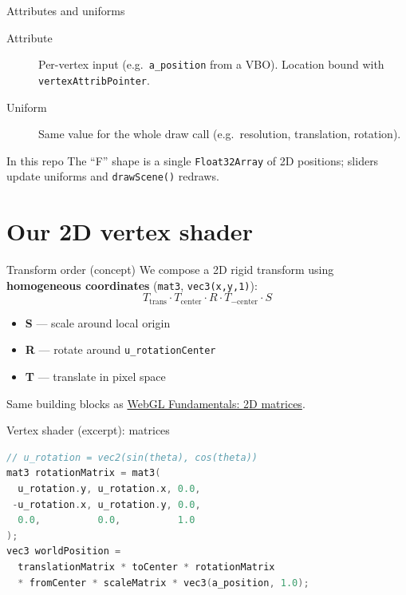\documentclass[aspectratio=169]{beamer}
\begin{document}
\begin{frame}{Attributes and uniforms}
  \begin{description}
    \item[Attribute] Per-vertex input (e.g.\ \texttt{a\_position} from a VBO). Location bound with \texttt{vertexAttribPointer}.
    \item[Uniform] Same value for the whole draw call (e.g.\ resolution, translation, rotation).
  \end{description}
  \vfill
  \begin{block}{In this repo}
    The ``F'' shape is a single \texttt{Float32Array} of 2D positions; sliders update uniforms and \texttt{drawScene()} redraws.
  \end{block}
\end{frame}

\section{Our 2D vertex shader}

\begin{frame}{Transform order (concept)}
  We compose a 2D rigid transform using \textbf{homogeneous coordinates} (\texttt{mat3}, \texttt{vec3(x,y,1)}):
  \[
    T_{\text{trans}} \cdot T_{\text{center}} \cdot R \cdot T_{-\text{center}} \cdot S
  \]
  \begin{itemize}
    \item \textbf{S} — scale around local origin
    \item \textbf{R} — rotate around \texttt{u\_rotationCenter}
    \item \textbf{T} — translate in pixel space
  \end{itemize}
  \vfill
  \small
  Same building blocks as \href{https://webglfundamentals.org/webgl/lessons/webgl-2d-matrices.html}{WebGL Fundamentals: 2D matrices}.
\end{frame}

\begin{frame}[fragile]{Vertex shader (excerpt): matrices}
\begin{lstlisting}[language=C]
// u_rotation = vec2(sin(theta), cos(theta))
mat3 rotationMatrix = mat3(
  u_rotation.y, u_rotation.x, 0.0,
 -u_rotation.x, u_rotation.y, 0.0,
  0.0,          0.0,          1.0
);
vec3 worldPosition =
  translationMatrix * toCenter * rotationMatrix
  * fromCenter * scaleMatrix * vec3(a_position, 1.0);
\end{lstlisting}
\end{frame}
\end{document}
